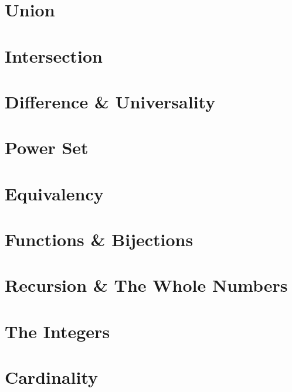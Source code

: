\documentclass[12pt, oneside]{book}
\begin{document}
\chapter{Union}\label{Union}
\vspace*{-0.25in}


\chapter{Intersection} \label{Intersection}
\vspace*{-0.25in}


\chapter{Difference \& Universality} \label{Difference}
\vspace*{-0.25in}


\chapter{Power Set} \label{Power Set}
\vspace*{-0.25in}


\chapter{Equivalency} \label{Equivalency}
\vspace*{-0.25in}


\chapter{Functions \& Bijections}\label{Functions}
\vspace*{-0.25in}


\chapter{Recursion \& The Whole Numbers}\label{Recursion}
\vspace*{-0.25in}


\chapter{The Integers} \label{Integers}
\vspace*{-0.25in}


\chapter{Cardinality} \label{Cardinality}
\vspace*{-0.25in}

\end{document}
